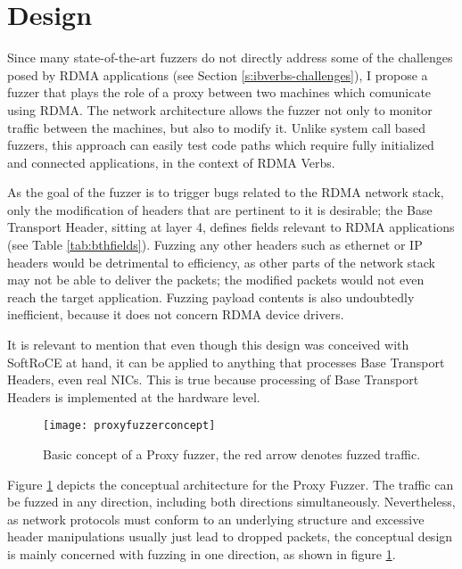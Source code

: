 \section{Design}\label{s:design}

Since many state-of-the-art fuzzers do not directly address some of the challenges
posed by RDMA applications (see Section \ref{s:ibverbs-challenges}), I propose a fuzzer that plays the role
of a proxy between two machines which comunicate using RDMA. The network architecture
allows the fuzzer not only to monitor traffic between the machines, but also to modify it.
Unlike system call based fuzzers, this approach can easily test code paths which require
fully initialized and connected applications, in the context of RDMA Verbs. %

As the goal of the fuzzer is to trigger bugs related to the RDMA network stack,
only the modification of headers that are pertinent to it is desirable;
the Base Transport Header, sitting at layer 4,
defines fields relevant to RDMA applications (see Table \ref{tab:bthfields}). Fuzzing any other headers such as
ethernet or IP headers would be detrimental to efficiency, as other parts of the network stack may not be able
to deliver the packets; the modified packets would
not even reach the target application. Fuzzing payload contents is also undoubtedly inefficient,
because it does not concern RDMA device drivers.

It is relevant to mention that even though this design was conceived with
SoftRoCE at hand, it can be applied to anything that processes Base
Transport Headers, even real NICs. This is true because processing of
Base Transport Headers is implemented at the hardware level. %

\begin{figure}[h]
  \centering
  \texttt{[image: proxyfuzzerconcept]}
  \caption[Proxy fuzzer concept]{Basic concept of a Proxy fuzzer, the red arrow denotes fuzzed traffic.}
  \label{fig:fuzzerconcept}
\end{figure}

Figure \ref{fig:fuzzerconcept} depicts the conceptual architecture for the Proxy Fuzzer.
The traffic can be fuzzed in any direction, including both directions simultaneously.
Nevertheless, as network protocols must conform to an underlying structure and excessive header manipulations usually
just lead to dropped packets, the conceptual
design is mainly concerned with fuzzing in one direction, as shown in figure \ref{fig:fuzzerconcept}.
